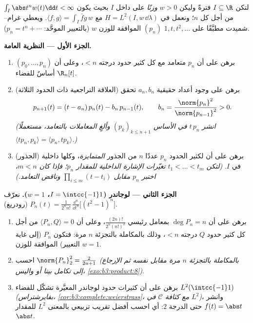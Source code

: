 \begin{problem}\label{pb:b3:hilbert:1}
لتكن $I \subseteq \R$ فترةً وليكن $w > 0$ \emph{وزنًا} 
على داخل $I$ بحيث يكون $\int_I
\abs t^nw(t)\dd t < \infty$ من أجل كل $n$؛ ونعمل في $H = L^2(I,
w\,\dd\lambda)$
مع $\langle f, g\rangle = \int_I \bar
fg\,w$. ويعطي غرام--شميدت مطبَّقًا على $1, t, t^2, \dots$
\emph{} $(p_n)$ الموافقة للوزن $w$
(بالتعيير الموحَّد: $p_n = t^n + \cdots$).

\medskip
\noindent\textbf{الجزء الأول --- النظرية العامة.}
\begin{enumerate}
  \item برهن على أن $p_n$ متعامد مع كل كثير حدود درجته $< n$،
        وعلى أن $(p_0, \dots, p_n)$ أساسٌ للفضاء $\R_n[t]$.
  \item (العلاقة التراجعية ذات الحدود الثلاثة) برهن على وجود
        أعداد حقيقية $a_n,
        b_n$ تحقق
        \[
        p_{n+1}(t) = (t - a_n)\,p_n(t) - b_n\,p_{n-1}(t),
        \qquad b_n = \frac{\norm{p_n}^2}{\norm{p_{n-1}}^2} >
        0 .
        \]
        \emph{(انشر $t\,p_n$ في الأساس $(p_k)_{k \leq
        n+1}$ وألغِ المعاملات
        بالتعامد، مستعملًا $\langle tp_n, p_k\rangle = \langle p_n,
        tp_k\rangle$.)}
  \item (الجذور) برهن على أن لكثير الحدود $p_n$ عددًا $n$ من
        الجذور \emph{المتمايزة}، وكلها داخلية في $I$.
        \emph{(لتكن $t_1 < \dots < t_m$ تغيّرات الإشارة الداخلية للمقدار
        $p_n$؛ فإذا كان $m < n$، اختبر $p_n$ مقابل $\prod_{i\leq m}(t - t_i)$
        وناقض التعامد.)}
\end{enumerate}

\medskip
\noindent\textbf{الجزء الثاني --- لوجاندر ($I = \intcc{-1}1$، $w =
1$).}
نعرّف $P_n(t) = \frac{1}{2^nn!}\,\frac{\dd^n}{\dd
t^n}\bigl[(t^2 - 1)^n\bigr]$ (رودريغ).
\begin{enumerate}[resume]
  \item برهن على أن $\deg P_n = n$ بمعامل رئيسي $\frac{(2n)!}{2^n(n!)^2}$، وعلى
        أن $\langle P_n, Q\rangle = 0$ من أجل كل كثير حدود $Q$ درجته $< n$، وذلك
        بالمكاملة بالتجزئة $n$ مرة: فتكون $P_n$ (إلى غاية
        التعيير)  الموافقة للوزن
        $w = 1$.
  \item احسب $\norm{P_n}_2^2 = \frac{2}{2n+1}$ \emph{(بالمكاملة بالتجزئة $n$ مرة مقابل
        نفسه ثم الإرجاع إلى تكامل بيتا أو واليس،
        \cref{exo:b3:product:8})}.
  \item برهن على أن كثيرات حدود لوجاندر المعيَّرة تشكّل  للفضاء $L^2(\intcc{-1}1)$ \emph{(بفايرشتراس،
        \cref{cor:b3:complete:weierstrass}، مع كثافة $\mathcal C$ في $L^2$)}، وانشر
        $f(t) = \abs t$ حتى الدرجة $2$: أي احسب أفضل تقريب
        تربيعي بالمعنى $L^2$ للمقدار $\abs t$.
\end{enumerate}


\end{problem}
